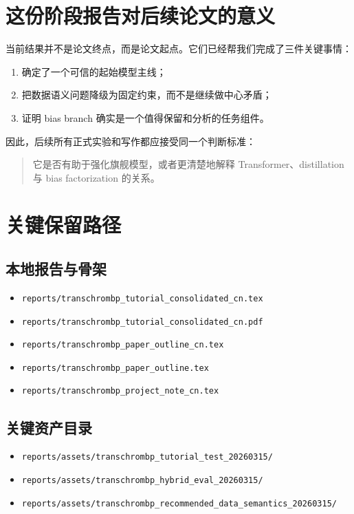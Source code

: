 \documentclass[11pt,a4paper]{ctexart}
\begin{document}
\section{这份阶段报告对后续论文的意义}

当前结果并不是论文终点，而是论文起点。它们已经帮我们完成了三件关键事情：
\begin{enumerate}[leftmargin=2em]
  \item 确定了一个可信的起始模型主线；
  \item 把数据语义问题降级为固定约束，而不是继续做中心矛盾；
  \item 证明 bias branch 确实是一个值得保留和分析的任务组件。
\end{enumerate}

因此，后续所有正式实验和写作都应接受同一个判断标准：
\begin{quote}
它是否有助于强化旗舰模型，或者更清楚地解释 Transformer、distillation 与 bias factorization
 的关系。
\end{quote}

\section{关键保留路径}

\subsection*{本地报告与骨架}
\begin{itemize}[leftmargin=2em]
  \item \texttt{reports/transchrombp\_tutorial\_consolidated\_cn.tex}
  \item \texttt{reports/transchrombp\_tutorial\_consolidated\_cn.pdf}
  \item \texttt{reports/transchrombp\_paper\_outline\_cn.tex}
  \item \texttt{reports/transchrombp\_paper\_outline.tex}
  \item \texttt{reports/transchrombp\_project\_note\_cn.tex}
\end{itemize}

\subsection*{关键资产目录}
\begin{itemize}[leftmargin=2em]
  \item \texttt{reports/assets/transchrombp\_tutorial\_test\_20260315/}
  \item \texttt{reports/assets/transchrombp\_hybrid\_eval\_20260315/}
  \item \texttt{reports/assets/transchrombp\_recommended\_data\_semantics\_20260315/}
\end{itemize}
\end{document}
